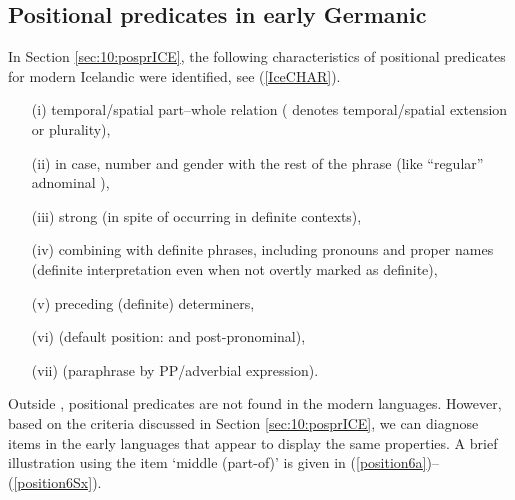 \documentclass[output=paper,colorlinks,citecolor=brown]{langscibook}
\begin{document}
\subsection{Positional predicates in early Germanic}
\label{sec:10:posprdEG}

In Section \ref{sec:10:posprICE}, the following characteristics of positional predicates for modern Icelandic were identified, see (\ref{IceCHAR}).

\begin{exe}
\ex \label{IceCHAR} 
\begin{enumerate}\sloppy
     \item[(i)] \label{enum:IceCHARi} temporal/spatial part--whole relation ( denotes temporal/spatial extension or plurality),
    \item[(ii)]  \label{enum:IceCHARii}  in case, number and gender with the rest of the  phrase 
    (like ``regular'' adnominal ), 
    \item[(iii)] strong  
    (in spite of occurring in definite contexts),   
    \item[(iv)] combining with definite  phrases, including pronouns and proper names (definite interpretation even when not overtly marked as definite),   
    \item[(v)] \label{IceCHARv} preceding (definite) determiners,
    \item[(vi)] (default position:  and post-pronominal),
    \item[(vii)] (paraphrase by PP/adverbial expression).
\end{enumerate}
\end{exe} 


Outside , positional predicates are not found in the modern  languages. However, based on the criteria discussed in Section \ref{sec:10:posprICE}, we can diagnose items in the early  languages that appear to display the same properties. A brief illustration using the item `middle (part-of)' is given in (\ref{position6a})--(\ref{position6Sx}).
\end{document}

